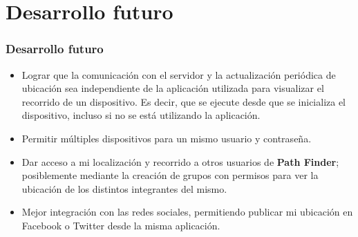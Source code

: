\section{Desarrollo futuro}

\begin{frame}

\frametitle{Desarrollo futuro}

\begin{itemize}

\item Lograr que la comunicaci\'on con el servidor y la actualizaci\'on peri\'odica de ubicaci\'on sea independiente de la aplicaci\'on utilizada para visualizar el recorrido de un dispositivo. Es decir, que se ejecute desde que se inicializa el dispositivo, incluso si no se est\'a utilizando la aplicaci\'on.

\pause

\item Permitir m\'ultiples dispositivos para un mismo usuario y contrase\~na.

\pause

\item Dar acceso a mi localizaci\'on y recorrido a otros usuarios de \textbf{Path Finder}; posiblemente mediante la creaci\'on de grupos con permisos para ver la ubicaci\'on de los distintos integrantes del mismo.

\pause

\item Mejor integraci\'on con las redes sociales, permitiendo publicar mi ubicaci\'on en Facebook o Twitter desde la misma aplicaci\'on.

\end{itemize}

\end{frame}
